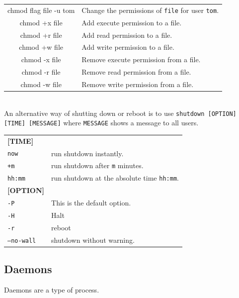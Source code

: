 \documentclass[10pt]{article}
\begin{document}
\begin{multicols}{2}
\begin{tabular}{C L}
    chmod flag file -u tom  & Change the permissions of \texttt{file} for user \texttt{tom}. \\
    chmod +x file           & Add execute permission to a file. \\
    chmod +r file           & Add read permission to a file. \\
    chmod +w file           & Add write permission to a file. \\
    chmod -x file           & Remove execute permission from a file. \\
    chmod -r file           & Remove read permission from a file. \\
    chmod -w file           & Remove write permission from a file. \\
\end{tabular}\\
An alternative way of shutting down or reboot is to use \texttt{shutdown [OPTION] [TIME] [MESSAGE]} where \texttt{MESSAGE} shows a message to all users. \\
\begin{tabular}{L L}
    \textbf{[TIME]}    & \\
    \texttt{now}       & run shutdown instantly.\\
    \texttt{+m}        & run shutdown after \texttt{m} minutes.\\
    \texttt{hh:mm}     & run shutdown at the absolute time \texttt{hh:mm}.\\
    \textbf{[OPTION]}  & \\
    \texttt{-P}        & This is the default option.\\
    \texttt{-H}        & Halt\\
    \texttt{-r}        & reboot\\
    \texttt{--no-wall} & shutdown without warning.\\
\end{tabular}

\subsection{Daemons}
Daemons are a type of process.

\end{multicols}
\end{document}
